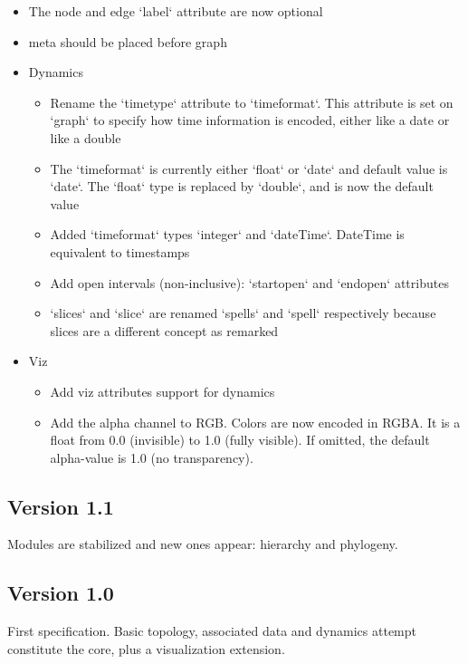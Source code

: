 \documentclass[a4paper,10pt]{article}
\begin{document}
\begin{itemize}
\item The node and edge `label` attribute are now optional
\item \<meta\> should be placed before \<graph\>
\item Dynamics
\begin{itemize}
\item Rename the `timetype` attribute to `timeformat`. This attribute is set on `\<graph\>` to specify how time information is encoded, either like a date or like a double
\item The `timeformat` is currently either `float` or `date` and default value is `date`. The `float` type is replaced by `double`, and is now the default value
\item Added `timeformat` types `integer` and `dateTime`. DateTime is equivalent to timestamps
\item Add open intervals (non-inclusive): `startopen` and `endopen` attributes
\item `\<slices\>` and `\<slice\>` are renamed `\<spells\>` and `\<spell\>` respectively because slices are a different concept as remarked
\end{itemize}
\item Viz
\begin{itemize}
\item Add viz attributes support for dynamics
\item Add the alpha channel to RGB. Colors are now encoded in RGBA. It is a float from 0.0 (invisible) to 1.0 (fully visible). If omitted, the default alpha-value is 1.0 (no transparency).
\end{itemize}
\end{itemize}

\subsection*{Version 1.1}

Modules are stabilized and new ones appear: hierarchy and phylogeny.

\subsection*{Version 1.0}

First specification. Basic topology, associated data and dynamics attempt constitute the core, plus a visualization extension.

\printindex
\end{document}
